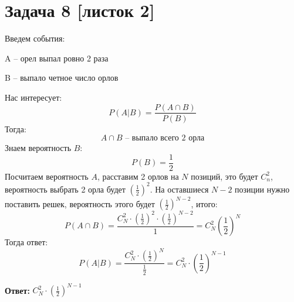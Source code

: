 \documentclass[a4paper,12pt]{article}
\begin{document}
\section*{Задача 8 [листок 2]}
Введем события:
\begin{center}
A -- орел выпал ровно 2 раза
\end{center}
\begin{center}
B -- выпало четное число орлов
\end{center}
Нас интересует:
\[
P(A | B) = \frac{P(A \cap B)}{P(B)}
\]
Тогда:
\[
A \cap B  \text{ -- выпало всего 2 орла}
\]
Знаем вероятность $B$:
\[
P(B) = \frac12
\]
Посчитаем вероятность $A$, расставим 2 орлов на $N$ позиций, это будет $C_n^2$, вероятность выбрать 2 орла будет $\left( \frac{1}{2} \right)^2$. На оставшиеся $N - 2$ позиции нужно поставить решек, вероятность этого будет $ \left( \frac{1}{2} \right)^{N -2}$, итого:
\[
P(A \cap B) = \frac{C_N^2 \cdot \left( \frac{1}{2} \right)^2 \cdot\left( \frac{1}{2} \right)^{N -2} }{1} = C_N^2 \left(\frac{1}{2}\right)^{N}
\]
 Тогда ответ:
\[
P(A | B) = \frac{C_N^2 \cdot \left( \frac{1}{2}\right)^N}{\frac12} = C_N^2 \cdot \left(\frac12\right)^{N- 1}
\]
\begin{center}
\textbf{Ответ: } $ C_N^2 \cdot \left(\frac12\right)^{N- 1}$
\end{center}
\end{document}
